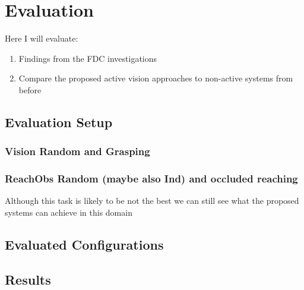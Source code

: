 \chapter{Evaluation}
Here I will evaluate:
\begin{enumerate}
  \item Findings from the FDC investigations
  \item Compare the proposed active vision approaches to non-active systems from before
\end{enumerate}


\section{Evaluation Setup}

\subsection{Vision Random and Grasping}

\subsection{ReachObs Random (maybe also Ind) and occluded reaching}
Although this task is likely to be not the best we can still see what the proposed systems can achieve in this domain

\section{Evaluated Configurations}

\section{Results}